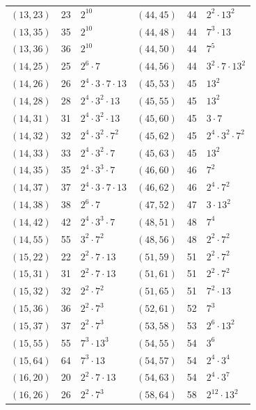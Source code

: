 \documentclass[11pt]{article}
\begin{document}
\begin{longtable}{@{}lrl@{\qquad}lrl@{}}
$(13,23)$ & 23 & $2^{10}$ & $(44,45)$ & 44 & $2^{2}\cdot 13^{2}$\\
$(13,35)$ & 35 & $2^{10}$ & $(44,48)$ & 44 & $7^{3}\cdot 13$\\
$(13,36)$ & 36 & $2^{10}$ & $(44,50)$ & 44 & $7^{5}$\\
$(14,25)$ & 25 & $2^{6}\cdot 7$ & $(44,56)$ & 44 & $3^{2}\cdot 7\cdot 13^{2}$\\
$(14,26)$ & 26 & $2^{4}\cdot 3\cdot 7\cdot 13$ & $(45,53)$ & 45 & $13^{2}$\\
$(14,28)$ & 28 & $2^{4}\cdot 3^{2}\cdot 13$ & $(45,55)$ & 45 & $13^{2}$\\
$(14,31)$ & 31 & $2^{4}\cdot 3^{2}\cdot 13$ & $(45,60)$ & 45 & $3\cdot 7$\\
$(14,32)$ & 32 & $2^{4}\cdot 3^{2}\cdot 7^{2}$ & $(45,62)$ & 45 & $2^{4}\cdot 3^{2}\cdot 7^{2}$\\
$(14,33)$ & 33 & $2^{4}\cdot 3^{2}\cdot 7$ & $(45,63)$ & 45 & $13^{2}$\\
$(14,35)$ & 35 & $2^{4}\cdot 3^{3}\cdot 7$ & $(46,60)$ & 46 & $7^{2}$\\
$(14,37)$ & 37 & $2^{4}\cdot 3\cdot 7\cdot 13$ & $(46,62)$ & 46 & $2^{4}\cdot 7^{2}$\\
$(14,38)$ & 38 & $2^{6}\cdot 7$ & $(47,52)$ & 47 & $3\cdot 13^{2}$\\
$(14,42)$ & 42 & $2^{4}\cdot 3^{3}\cdot 7$ & $(48,51)$ & 48 & $7^{4}$\\
$(14,55)$ & 55 & $3^{2}\cdot 7^{2}$ & $(48,56)$ & 48 & $2^{2}\cdot 7^{2}$\\
$(15,22)$ & 22 & $2^{2}\cdot 7\cdot 13$ & $(51,59)$ & 51 & $2^{2}\cdot 7^{2}$\\
$(15,31)$ & 31 & $2^{2}\cdot 7\cdot 13$ & $(51,61)$ & 51 & $2^{2}\cdot 7^{2}$\\
$(15,32)$ & 32 & $2^{2}\cdot 7^{2}$ & $(51,65)$ & 51 & $7^{2}\cdot 13$\\
$(15,36)$ & 36 & $2^{2}\cdot 7^{3}$ & $(52,61)$ & 52 & $7^{3}$\\
$(15,37)$ & 37 & $2^{2}\cdot 7^{3}$ & $(53,58)$ & 53 & $2^{6}\cdot 13^{2}$\\
$(15,55)$ & 55 & $7^{3}\cdot 13^{3}$ & $(54,55)$ & 54 & $3^{6}$\\
$(15,64)$ & 64 & $7^{3}\cdot 13$ & $(54,57)$ & 54 & $2^{4}\cdot 3^{4}$\\
$(16,20)$ & 20 & $2^{2}\cdot 7\cdot 13$ & $(54,63)$ & 54 & $2^{4}\cdot 3^{7}$\\
$(16,26)$ & 26 & $2^{2}\cdot 7^{3}$ & $(58,64)$ & 58 & $2^{12}\cdot 13^{2}$\\

\end{longtable}
\end{document}
